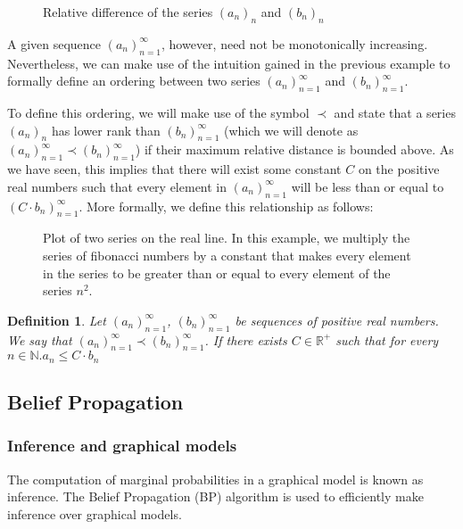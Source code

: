 \documentclass[11pt]{article}
\newtheorem{definition}{Definition}
\begin{document}
\begin{figure*}[h!]
	\centering
	\scalebox{0.5}{}
	\caption{Relative difference of the series $(a_n)_n$ and $(b_n)_n$}
	\label{fig:relative-growth}
\end{figure*}


A given sequence $(a_n)_{n=1}^\infty$, however, need not be monotonically increasing. Nevertheless, we can make use of the intuition gained in the previous example to formally define an ordering between two series $(a_n)_{n=1}^\infty$ and $(b_n)_{n=1}^\infty$.

To define this ordering, we will make use of the symbol $\prec$ and state that a series $(a_n)_n$ has lower rank than $(b_n)_{n=1}^\infty$ (which we will denote as $(a_n)_{n=1}^\infty \prec (b_n)_{n=1}^\infty$) if their maximum relative distance is bounded above. As we have seen, this implies that there will exist some constant $C$ on the positive real numbers such that every element in $(a_n)_{n=1}^\infty$ will be less than or equal to $(C \cdot b_n)_{n=1}^\infty$. More formally, we define this relationship as follows:


\begin{figure*}[h!]
	\centering
	\scalebox{0.5}{}
	\caption{Plot of two series on the real line. In this example, we multiply the series of fibonacci numbers by a constant that makes every element in the series to be greater than or equal to every element of the series $n^2$.}
	\label{fig:growth-2}
\end{figure*}


\begin{definition}
	Let $(a_n)_{n=1}^\infty$, $(b_n)_{n=1}^\infty$ be sequences of positive real numbers. We say that $(a_n)_{n=1}^\infty \prec (b_n)_{n=1}^\infty$. If there exists $C\in\mathbb{R}^{+}$ such that for every $n\in\mathbb{N}. a_n \leq C\cdot b_n$
\end{definition}

\subsection*{Belief Propagation}
\subsubsection*{Inference and graphical models}
The computation of marginal probabilities in a graphical model is known as inference. The Belief Propagation (BP) algorithm is used to efficiently make inference over graphical models.
\end{document}
